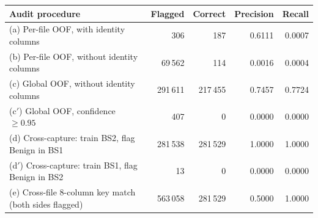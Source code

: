 \begin{tabular}{l rrrr}
\toprule
Audit procedure & Flagged & Correct & Precision & Recall\\
\midrule
(a) Per-file OOF, with identity columns & 306 & 187 & 0.6111 & 0.0007\\
(b) Per-file OOF, without identity columns & 69\,562 & 114 & 0.0016 & 0.0004\\
(c) Global OOF, without identity columns & 291\,611 & 217\,455 & 0.7457 & 0.7724\\
(c$'$) Global OOF, confidence $\geq 0.95$ & 407 & 0 & 0.0000 & 0.0000\\
(d) Cross-capture: train BS2, flag Benign in BS1 & 281\,538 & 281\,529 & 1.0000 & 1.0000\\
(d$'$) Cross-capture: train BS1, flag Benign in BS2 & 13 & 0 & 0.0000 & 0.0000\\
(e) Cross-file 8-column key match (both sides flagged) & 563\,058 & 281\,529 & 0.5000 & 1.0000\\
\bottomrule
\end{tabular}
